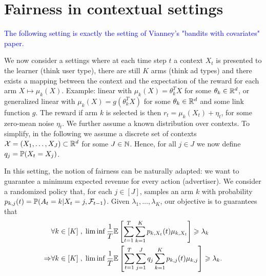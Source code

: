 \section{Fairness in contextual settings}

\textcolor{blue}{The following setting is exactly the setting of Vianney's "bandits with covariates" paper.}

We now consider a settings where at each time step $t$ a context $X_t$ is presented to the learner (think user type), there are still $K$ arms (think ad types) and there exists a mapping between the context and the expectation of the reward for each arm $X \mapsto \mu_k(X)$. Example: linear with $\mu_k(X)=\theta_k^T X$ for some $\theta_k \in \mathbb{R}^d$, or generalized linear with $\mu_k(X)=g(\theta_k^T X)$ for some $\theta_k \in \mathbb{R}^d$ and some link function $g$. The reward if arm $k$ is selected is then $r_t=\mu_k(X_t)+\eta_t$, for some zero-mean noise $\eta_t$. We further assume a known distribution over contexts. To simplify, in the following we assume a discrete set of contexts $\mathcal{X}=(X_1,\dots, X_J) \subset \mathbb{R}^d$ for some $J\in \mathbb{N}$. Hence, for all $j \in J$ we now define $q_j = \mathbb{P}(X_t=X_j)$.

In this setting, the notion of fairness can be naturally adapted: we want to guarantee a minimum expected revenue for every action (advertiser). We consider a randomized policy that, for each $j \in [J]$, samples an arm $k$ with probability $p_{k, j}(t) = \mathbb{P}(A_t=k|X_t=j, \mathcal{F}_{t-1})$. Given $\lambda_1, \dots, \lambda_K$, our objective is to guarantees that 
\begin{align*}
&\forall k \in [K]\;, \; \liminf \frac{1}{T}\mathbb{E}\left[\sum_{t=1}^T \sum_{k=1}^K p_{k,X_t}(t)\mu_{k, X_t}\right] \geqslant \lambda_k\\ \Rightarrow &\forall k \in [K]\;, \; \liminf \frac{1}{T}\mathbb{E}\left[\sum_{t=1}^T \sum_{j=1}^J q_j \sum_{k=1}^K p_{k,j}(t)\mu_{k, j}\right] \geqslant \lambda_k . \end{align*}

